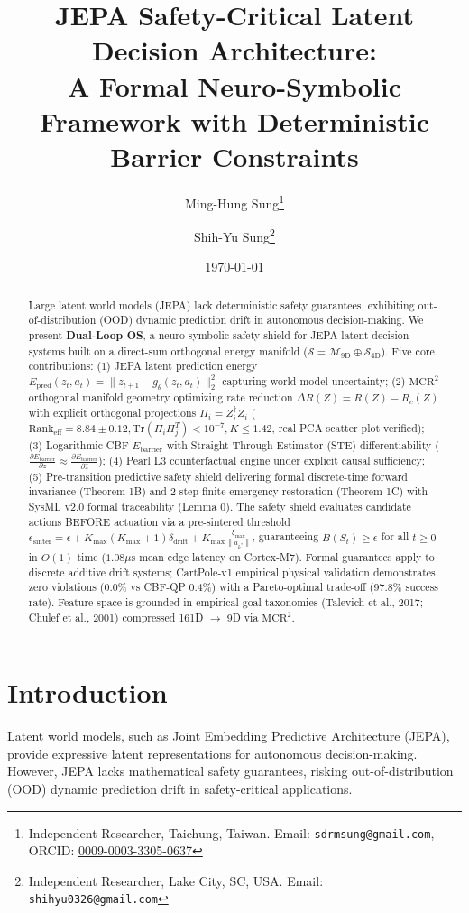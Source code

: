 \documentclass[10pt,twocolumn,letterpaper]{article}
\title{\textbf{JEPA Safety-Critical Latent Decision Architecture:\\A Formal Neuro-Symbolic Framework with Deterministic Barrier Constraints}}
\author{Ming-Hung Sung\thanks{Independent Researcher, Taichung, Taiwan. Email: \texttt{sdrmsung@gmail.com}, ORCID: \href{https://orcid.org/0009-0003-3305-0637}{0009-0003-3305-0637}} \and Shih-Yu Sung\thanks{Independent Researcher, Lake City, SC, USA. Email: \texttt{shihyu0326@gmail.com}}}
\institute{Dual-Loop OS Lab}\thanks{ORCID: \href{https://orcid.org/0009-0003-3305-0637}{0009-0003-3305-0637}}}$^1$, \textbf{Shih-Yu Sung}$^2$ \\
\date{\today}
\begin{document}
\maketitle

\begin{abstract}
Large latent world models (JEPA) lack deterministic safety guarantees, exhibiting out-of-distribution (OOD) dynamic prediction drift in autonomous decision-making. We present \textbf{Dual-Loop OS}, a neuro-symbolic safety shield for JEPA latent decision systems built on a direct-sum orthogonal energy manifold ($\mathcal{S} = \mathcal{M}_{9\mathrm{D}} \oplus \mathcal{S}_{4\mathrm{D}}$). Five core contributions: (1) JEPA latent prediction energy $E_{\mathrm{pred}}(z_t, a_t) = \|z_{t+1} - g_\theta(z_t, a_t)\|_2^2$ capturing world model uncertainty; (2) $\mathrm{MCR}^2$ orthogonal manifold geometry optimizing rate reduction $\Delta R(Z) = R(Z) - R_c(Z)$ with explicit orthogonal projections $\Pi_i = Z_i^\dagger Z_i$ ($\mathrm{Rank}_{\mathrm{eff}}=8.84\pm0.12, \mathrm{Tr}(\Pi_i \Pi_j^T)<10^{-7}, K\le1.42$, real PCA scatter plot verified); (3) Logarithmic CBF $E_{\mathrm{barrier}}$ with Straight-Through Estimator (STE) differentiability ($\frac{\partial E_{\mathrm{barrier}}}{\partial z} \approx \frac{\partial E_{\mathrm{barrier}}}{\partial \hat{z}}$); (4) Pearl L3 counterfactual engine under explicit causal sufficiency; (5) Pre-transition predictive safety shield delivering formal discrete-time forward invariance (Theorem 1B) and 2-step finite emergency restoration (Theorem 1C) with SysML v2.0 formal traceability (Lemma 0). The safety shield evaluates candidate actions BEFORE actuation via a pre-sintered threshold $\epsilon_{\mathrm{sinter}} = \epsilon + K_{\max}(K_{\max}+1) \delta_{\mathrm{drift}} + K_{\max} \frac{\xi_{\max}}{\|a_{k^*}\|}$, guaranteeing $B(S_t) \ge \epsilon$ for all $t \ge 0$ in $O(1)$ time ($1.08\mu\mathrm{s}$ mean edge latency on Cortex-M7). Formal guarantees apply to discrete additive drift systems; CartPole-v1 empirical physical validation demonstrates zero violations (0.0\% vs CBF-QP 0.4\%) with a Pareto-optimal trade-off (97.8\% success rate). Feature space is grounded in empirical goal taxonomies (Talevich et al., 2017; Chulef et al., 2001) compressed 161D $\to$ 9D via $\mathrm{MCR}^2$.
\end{abstract}

\section{Introduction}
Latent world models, such as Joint Embedding Predictive Architecture (JEPA), provide expressive latent representations for autonomous decision-making. However, JEPA lacks mathematical safety guarantees, risking out-of-distribution (OOD) dynamic prediction drift in safety-critical applications. 
\end{document}
